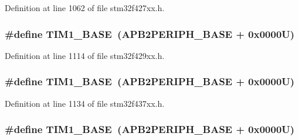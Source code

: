 Definition at line 1062 of file stm32f427xx.\+h.

\subsubsection[{\texorpdfstring{T\+I\+M1\+\_\+\+B\+A\+SE}{TIM1_BASE}}]{\setlength{\rightskip}{0pt plus 5cm}\#define T\+I\+M1\+\_\+\+B\+A\+SE~({\bf A\+P\+B2\+P\+E\+R\+I\+P\+H\+\_\+\+B\+A\+SE} + 0x0000\+U)}\hypertarget{group___peripheral__memory__map_gaf8aa324ca5011b8173ab16585ed7324a}{}\label{group___peripheral__memory__map_gaf8aa324ca5011b8173ab16585ed7324a}


Definition at line 1114 of file stm32f429xx.\+h.

\subsubsection[{\texorpdfstring{T\+I\+M1\+\_\+\+B\+A\+SE}{TIM1_BASE}}]{\setlength{\rightskip}{0pt plus 5cm}\#define T\+I\+M1\+\_\+\+B\+A\+SE~({\bf A\+P\+B2\+P\+E\+R\+I\+P\+H\+\_\+\+B\+A\+SE} + 0x0000\+U)}\hypertarget{group___peripheral__memory__map_gaf8aa324ca5011b8173ab16585ed7324a}{}\label{group___peripheral__memory__map_gaf8aa324ca5011b8173ab16585ed7324a}


Definition at line 1134 of file stm32f437xx.\+h.

\subsubsection[{\texorpdfstring{T\+I\+M1\+\_\+\+B\+A\+SE}{TIM1_BASE}}]{\setlength{\rightskip}{0pt plus 5cm}\#define T\+I\+M1\+\_\+\+B\+A\+SE~({\bf A\+P\+B2\+P\+E\+R\+I\+P\+H\+\_\+\+B\+A\+SE} + 0x0000\+U)}\hypertarget{group___peripheral__memory__map_gaf8aa324ca5011b8173ab16585ed7324a}{}\label{group___peripheral__memory__map_gaf8aa324ca5011b8173ab16585ed7324a}


